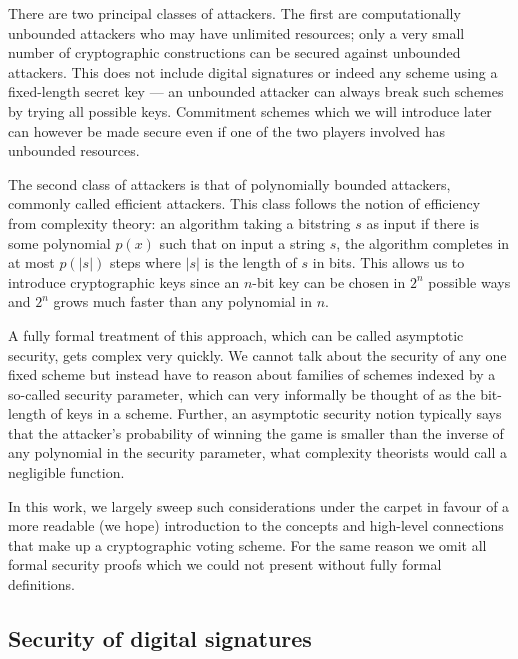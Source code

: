 \documentclass[envcountsame]{llncs}
\begin{document}
There are two principal classes of attackers. The first are computationally
unbounded attackers who may have unlimited resources; only a very small number
of cryptographic constructions can be secured against unbounded attackers. This
does not include digital signatures or indeed any scheme using a fixed-length
secret key --- an unbounded attacker can always break such schemes by trying all
possible keys. Commitment schemes which we will introduce later can however be
made secure even if one of the two players involved has unbounded resources.

The second class of attackers is that of polynomially bounded attackers,
commonly called efficient attackers. This class follows the notion of efficiency
from complexity theory: an algorithm taking a bitstring $s$ as input if there is
some polynomial $p(x)$ such that on input a string $s$, the algorithm completes
in at most $p(|s|)$ steps where $|s|$ is the length of $s$ in bits. This allows
us to introduce cryptographic keys since an $n$-bit key can be chosen in $2^n$
possible ways and $2^n$ grows much faster than any polynomial in $n$.

A fully formal treatment of this approach, which can be called asymptotic
security, gets complex very quickly. We cannot talk about the security of any
one fixed scheme but instead have to reason about families of schemes indexed by
a so-called security parameter, which can very informally be thought of as the
bit-length of keys in a scheme. Further, an asymptotic security notion typically
says that the attacker's probability of winning the game is smaller than the
inverse of any polynomial in the security parameter, what complexity theorists
would call a negligible function\footnotemark.


In this work, we largely sweep such considerations under the carpet in favour of
a more readable (we hope) introduction to the concepts and high-level
connections that make up a cryptographic voting scheme. For the same reason we
omit all formal security proofs which we could not present without fully formal
definitions.

\subsection{Security of digital signatures}
\end{document}
